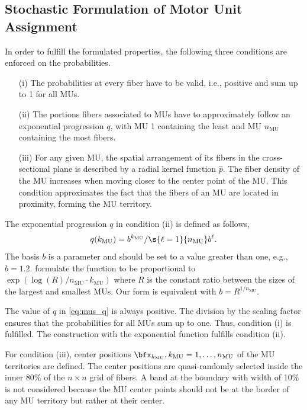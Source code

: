 \subsection{Stochastic Formulation of Motor Unit Assignment}\label{sec:stochastic_formulation_and_algorithm}

In order to fulfill the formulated properties, the following three conditions are enforced on the probabilities. 
\begin{itemize}
\item[(i)] The probabilities at every fiber  have to be valid, i.e., positive and sum up to 1 for all MUs.
\item[(ii)] The portions fibers associated to MUs have to approximately follow an exponential progression $q$, with MU 1 containing the least and MU $n_\text{MU}$ containing the most fibers.
\item[(iii)] For any given MU, the spatial arrangement of its fibers in the cross-sectional plane is described by a radial kernel function $\hat{p}$. The fiber density of the MU increases when moving closer to the center point of the MU. This condition approximates the fact that the fibers of an MU are located in proximity, forming the MU territory.
\end{itemize}

The exponential progression $q$ in condition (ii) is defined as follows,
%
\begin{align}\label{eq:mus_q}
  q(k_\text{MU}) = b^{k_\text{MU}} / \s{\ell=1}{n_\text{MU}} b^\ell.
\end{align}
%
%
% 
The basis $b$ is a parameter and should be set to a value greater than one, e.g., $b=\num{1.2}$. \Cite{Enoka2001} formulate the function to be proportional to $\exp(\log(R)/n_\text{MU}\cdot k_\text{MU})$ where $R$ is the constant ratio between the sizes of the largest and smallest MUs. Our form is equivalent with $b = R^{1/n_\text{MU}}$.

The value of $q$ in \cref{eq:mus_q} is always positive. The division by the scaling factor ensures that the probabilities for all MUs sum up to one. Thus, condition (i) is fulfilled. The construction with the exponential function fulfills condition (ii).

For condition (iii), center positions $\bfx_{k_\text{MU}}, k_\text{MU}=1, \dots, n_\text{MU}$ of the MU territories are defined. 
The center positions are quasi-randomly selected inside the inner 80\% of the $n \times n$ grid of fibers. A band at the boundary with width of 10\% is not considered because the MU center points should not be at the border of any MU territory but rather at their center.

